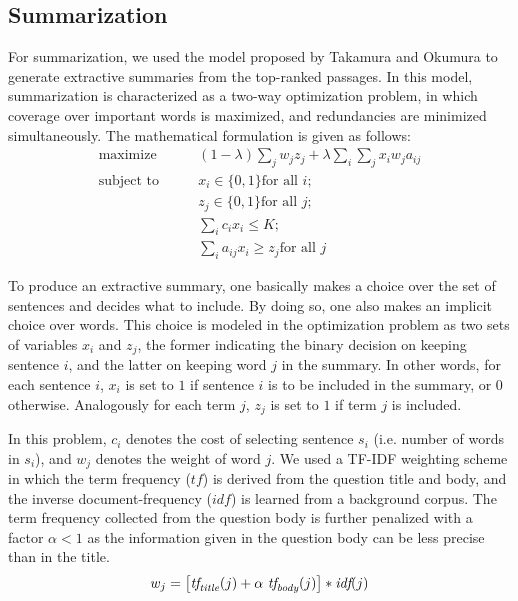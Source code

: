 \documentclass[a4paper,10pt,conference,compsocconf,final]{IEEEtran}
\newcommand{\var}[1]{\mbox{\emph{#1}}}
\begin{document}
{{{{\subsection{Summarization}
\label{sec:sum}

For summarization, we used the model proposed by Takamura and Okumura
\cite{takamura2009text} to generate extractive summaries from the
top-ranked passages.
In this model, summarization is characterized as a two-way
optimization problem, in which coverage over important words is
maximized, and redundancies are minimized simultaneously.
The mathematical formulation is given as follows:
\begin{equation}
\begin{split}
  \textrm{maximize} \qquad & (1-\lambda) \sum_{j} w_j z_j + \lambda \sum_{i}\sum_{j} x_i w_j a_{ij} \\
  \textrm{subject to} \qquad 
       & x_i \in \{0,1\} \textrm{for all $i$}; \\ 
       & z_j \in \{0,1\} \textrm{for all $j$}; \\
       & \sum_{i} c_ix_i \le K; \\
       & \sum_{i}^{} a_{ij}x_i \ge z_j \textrm{for all $j$} 
\end{split}
\end{equation}

To produce an extractive summary, one basically makes a choice over
the set of sentences and decides what to include.
By doing so, one also makes an implicit choice over words.
This choice is modeled in the optimization problem as two sets of
variables $x_i$ and $z_j$, the former indicating the binary decision
on keeping sentence $i$, and the latter on keeping word $j$ in
the summary.
In other words, for each sentence $i$, $x_i$ is set to $1$ if sentence
$i$ is to be included in the summary, or $0$ otherwise.
Analogously for each term $j$, $z_j$ is set to $1$ if term $j$ is
included.

In this problem, $c_i$ denotes the cost of selecting sentence $s_i$ (i.e.
number of words in $s_i$), and $w_j$ denotes the weight of word $j$.
We used a TF-IDF weighting scheme in which the term frequency ($tf$) is
derived from the question title and body, and the inverse document-frequency
($idf$) is learned from a background corpus.
The term frequency collected from the question body is further penalized with
a factor $\alpha < 1$ as the information given in the question body can
be less precise than in the title.
\begin{equation}
  w_j = \left[ \var{tf}_{\var{title}}(j) + \alpha ~ \var{tf}_{\var{body}}(j) \right] * \var{idf}(j)
\end{equation}

}}}}
\end{document}
